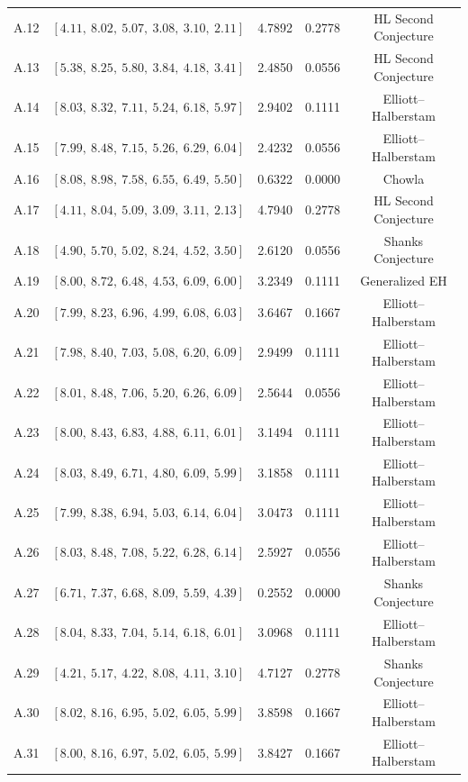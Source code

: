 \documentclass[11pt,reqno]{amsart}
\theoremstyle{plain}\newtheorem{theorem}{Theorem}[section]
\numberwithin{equation}{section}
\begin{document}
\begin{table}[ht]
\begin{center}
\begin{tabular}{|c|c|c|c|c|}
A.12 & $[4.11,\ 8.02,\ 5.07,\ 3.08,\ 3.10,\ 2.11]$ & 4.7892 & 0.2778 & HL Second Conjecture \\
A.13 & $[5.38,\ 8.25,\ 5.80,\ 3.84,\ 4.18,\ 3.41]$ & 2.4850 & 0.0556 & HL Second Conjecture \\
A.14 & $[8.03,\ 8.32,\ 7.11,\ 5.24,\ 6.18,\ 5.97]$ & 2.9402 & 0.1111 & Elliott--Halberstam \\
A.15 & $[7.99,\ 8.48,\ 7.15,\ 5.26,\ 6.29,\ 6.04]$ & 2.4232 & 0.0556 & Elliott--Halberstam  \\
A.16 & $[8.08,\ 8.98,\ 7.58,\ 6.55,\ 6.49,\ 5.50]$ & 0.6322 & 0.0000 & Chowla\\
A.17 & $[4.11,\ 8.04,\ 5.09,\ 3.09,\ 3.11,\ 2.13]$ & 4.7940 & 0.2778 & HL Second Conjecture \\
A.18 & $[4.90,\ 5.70,\ 5.02,\ 8.24,\ 4.52,\ 3.50]$ & 2.6120 & 0.0556 & Shanks Conjecture\\
A.19 & $[8.00,\ 8.72,\ 6.48,\ 4.53,\ 6.09,\ 6.00]$ & 3.2349 & 0.1111 & Generalized EH  \\
A.20 & $[7.99,\ 8.23,\ 6.96,\ 4.99,\ 6.08,\ 6.03]$ & 3.6467 & 0.1667 & Elliott--Halberstam \\
A.21 & $[7.98,\ 8.40,\ 7.03,\ 5.08,\ 6.20,\ 6.09]$ & 2.9499 & 0.1111 & Elliott--Halberstam  \\
A.22 & $[8.01,\ 8.48,\ 7.06,\ 5.20,\ 6.26,\ 6.09]$ & 2.5644 & 0.0556 & Elliott--Halberstam  \\
A.23 & $[8.00,\ 8.43,\ 6.83,\ 4.88,\ 6.11,\ 6.01]$ & 3.1494 & 0.1111 & Elliott--Halberstam \\
A.24 & $[8.03,\ 8.49,\ 6.71,\ 4.80,\ 6.09,\ 5.99]$ & 3.1858 & 0.1111 & Elliott--Halberstam  \\
A.25 & $[7.99,\ 8.38,\ 6.94,\ 5.03,\ 6.14,\ 6.04]$ & 3.0473 & 0.1111 & Elliott--Halberstam \\
A.26 & $[8.03,\ 8.48,\ 7.08,\ 5.22,\ 6.28,\ 6.14]$ & 2.5927 & 0.0556 & Elliott--Halberstam  \\
A.27 & $[6.71,\ 7.37,\ 6.68,\ 8.09,\ 5.59,\ 4.39]$ & 0.2552 & 0.0000 & Shanks Conjecture\\
A.28 & $[8.04,\ 8.33,\ 7.04,\ 5.14,\ 6.18,\ 6.01]$ & 3.0968 & 0.1111 & Elliott--Halberstam \\
A.29 & $[4.21,\ 5.17,\ 4.22,\ 8.08,\ 4.11,\ 3.10]$ & 4.7127 & 0.2778 & Shanks Conjecture \\
A.30 & $[8.02,\ 8.16,\ 6.95,\ 5.02,\ 6.05,\ 5.99]$ & 3.8598 & 0.1667 & Elliott--Halberstam \\
A.31 & $[8.00,\ 8.16,\ 6.97,\ 5.02,\ 6.05,\ 5.99]$ & 3.8427 & 0.1667 & Elliott--Halberstam \\

\end{tabular}
\end{center}
\end{table}
\end{document}
